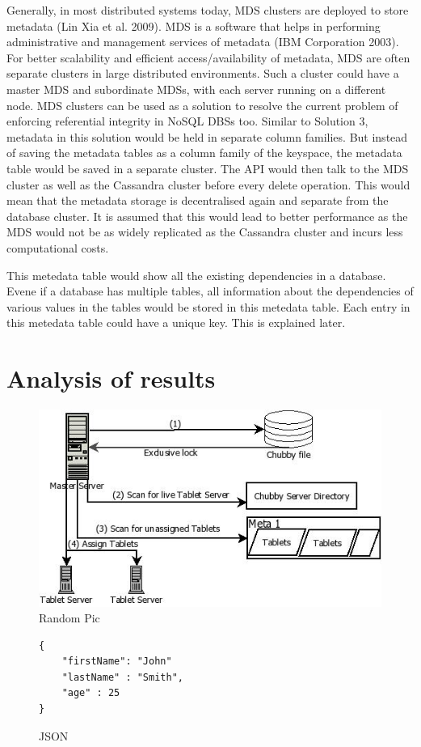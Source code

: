 Generally, in most distributed systems today, MDS clusters are deployed to store
metadata (Lin Xia et al. 2009). MDS is a software that helps in performing
administrative and management services of metadata (IBM Corporation 2003). For
better scalability and efficient access/availability of metadata, MDS are often
separate clusters in large distributed environments. Such a cluster could have
a master MDS and subordinate MDSs, with each server running on a different node.
MDS clusters can be used as a solution to resolve the current problem of
enforcing referential integrity in NoSQL DBSs too. Similar to Solution 3,
metadata in this solution would be held in separate column families. But instead
of saving the metadata tables as a column family of the keyspace, the metadata
table would be saved in a separate cluster. The API would then talk to the MDS
cluster as well as the Cassandra cluster before every delete operation.
This would mean that the metadata storage is decentralised again and separate
from the database cluster. It is assumed that this would lead to better
performance as the MDS would not be as widely replicated as the Cassandra
cluster and incurs less computational costs.


This metedata table would show all the existing dependencies in a database.
Evene if a database has multiple tables, all information about the dependencies
of various values in the tables would be stored in this metedata table. Each
entry in this metedata table could have a unique key. This is explained later.

\section{Analysis of results}\label{s:summary}

\begin{figure}
	\centering
	\includegraphics[width=.5\textwidth]{./figure/random.jpg}
	\caption{Random Pic}\label{f:random-pic}
\end{figure}


\begin{figure}

\begin{verbatim}
{     
    "firstName": "John"
    "lastName" : "Smith",
    "age" : 25
}
\end{verbatim}
\caption{JSON}
\end{figure}
